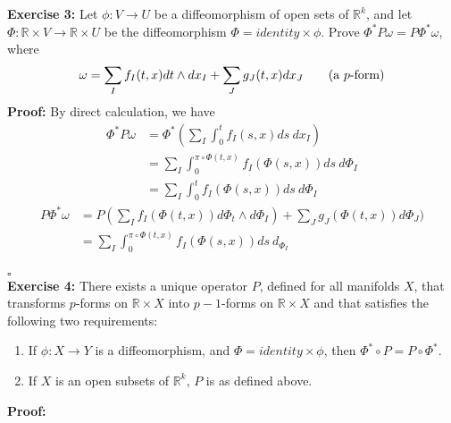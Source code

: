 \documentclass[12pt]{amsart}
\newcommand{\R}{\mathbb{R}}
\begin{document}
\indent \textbf{Exercise 3:} Let $\phi: V\rightarrow U$ be a diffeomorphism of open sets of $\R^k$, and let $\Phi:\R \times V \rightarrow \R \times U$ be the diffeomorphism $\Phi=identity \times \phi$. Prove $\Phi^\ast P\omega = P\Phi^\ast \omega $, where 
\[\omega = \sum_I f_I(t,x)dt\wedge dx_I+\sum_J g_J(t,x)dx_J\tag{\text{a $p$-form}}\]
\indent\textbf{Proof: } By direct calculation, we have 
\begin{align*}
    \Phi^\ast P\omega&=\Phi^\ast(\sum_I \int_{0}^t f_I(s,x)ds \ dx_I)\\
    &=\sum_I \int_{0}^{\pi\circ\Phi(t,x)} f_I(\Phi(s,x))ds \ d\Phi_I\\
    &=\sum_I \int_{0}^t f_I(\Phi(s,x))ds \ d\Phi_I
\end{align*}
\begin{align*}
    P\Phi^\ast\omega&=P (\sum_I f_I(\Phi(t,x))d\Phi_t\wedge d\Phi_I)+\sum_J g_J(\Phi(t,x))d\Phi_J)\\
    &=\sum_I \int_{0}^{\pi\circ\Phi(t,x)} f_I(\Phi(s,x))ds \ d_{\Phi_I}
\end{align*}
\\\phantom{qed}\hfill$\square$\\
\indent\textbf{Exercise 4:} There exists a unique operator $P$, defined for all manifolds $X$, that transforms $p$-forms on $\R\times X$ into $p-1$-forms on $\R\times X$ and that satisfies the following two requirements: \\
\begin{enumerate}
    \item If $\phi : X \rightarrow Y$ is a diffeomorphism, and $\Phi= identity \times \phi$, then $\Phi^\ast \circ P= P \circ \Phi^\ast$.
    \item If $X$ is an open subsets of $\R^k$, $P$ is as defined above. 
\end{enumerate}
\indent\textbf{Proof:} 
\end{document}
